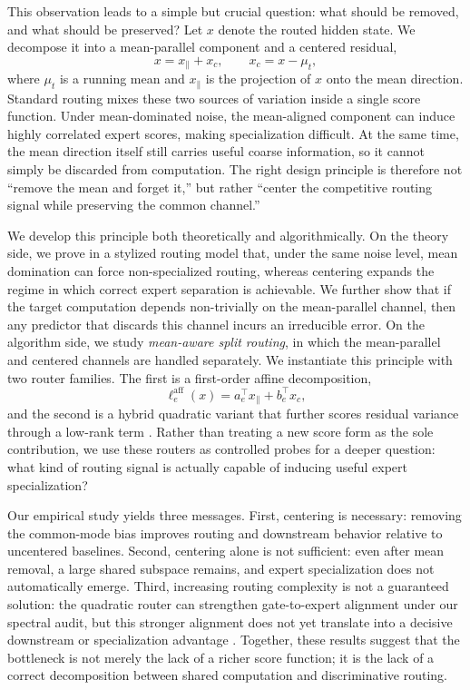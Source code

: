This observation leads to a simple but crucial question: what should be removed, and what should be preserved? Let $x$ denote the routed hidden state. We decompose it into a mean-parallel component and a centered residual,
\[
    x = x_{\parallel} + x_c,
    \qquad
    x_c = x - \mu_t,
\]
where $\mu_t$ is a running mean and $x_{\parallel}$ is the projection of $x$ onto the mean direction. Standard routing mixes these two sources of variation inside a single score function. Under mean-dominated noise, the mean-aligned component can induce highly correlated expert scores, making specialization difficult. At the same time, the mean direction itself still carries useful coarse information, so it cannot simply be discarded from computation. The right design principle is therefore not ``remove the mean and forget it,'' but rather ``center the competitive routing signal while preserving the common channel.''

We develop this principle both theoretically and algorithmically. On the theory side, we prove in a stylized routing model that, under the same noise level, mean domination can force non-specialized routing, whereas centering expands the regime in which correct expert separation is achievable. We further show that if the target computation depends non-trivially on the mean-parallel channel, then any predictor that discards this channel incurs an irreducible error. On the algorithm side, we study \emph{mean-aware split routing}, in which the mean-parallel and centered channels are handled separately. We instantiate this principle with two router families. The first is a first-order affine decomposition,
\[
    \ell_e^{\mathrm{aff}}(x) = a_e^\top x_{\parallel} + b_e^\top x_c,
\]
and the second is a hybrid quadratic variant that further scores residual variance through a low-rank term . Rather than treating a new score form as the sole contribution, we use these routers as controlled probes for a deeper question: what kind of routing signal is actually capable of inducing useful expert specialization?

Our empirical study yields three messages. First, centering is necessary: removing the common-mode bias improves routing and downstream behavior relative to uncentered baselines. Second, centering alone is not sufficient: even after mean removal, a large shared subspace remains, and expert specialization does not automatically emerge. Third, increasing routing complexity is not a guaranteed solution: the quadratic router can strengthen gate-to-expert alignment under our spectral audit, but this stronger alignment does not yet translate into a decisive downstream or specialization advantage . Together, these results suggest that the bottleneck is not merely the lack of a richer score function; it is the lack of a correct decomposition between shared computation and discriminative routing.

